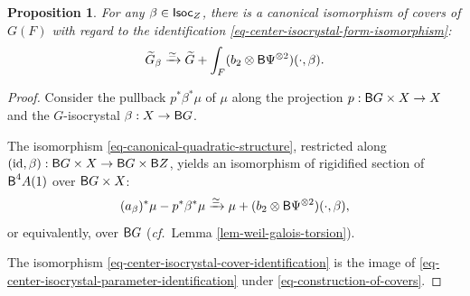 \documentclass[10pt,english,reqno]{amsart}
\newcommand{\Isoc}{\textnormal{\textsf{Isoc}}}
\newcommand{\id}{\mathrm{id}}
\newcommand{\deloop}{\textnormal{\textsf{B}}}
\newtheorem{prop}[subsubsection]{Proposition}
\theoremstyle{definition}
\numberwithin{equation}{section}
\begin{document}
\begin{prop}
\label{prop-center-isocrystal-cover-identification}
For any $\beta \in \Isoc_Z$, there is a canonical isomorphism of covers of $G(F)$ with regard to the identification \eqref{eq-center-isocrystal-form-isomorphism}:
\begin{equation}
\label{eq-center-isocrystal-cover-identification}
\widetilde G_{\beta} \xrightarrow{\simeq} \widetilde G + \int_F (b_2\otimes \deloop\Psi^{\otimes 2})(\cdot, \beta).
\end{equation}
\end{prop}
\begin{proof}
Consider the pullback $p^*\beta^*\mu$ of $\mu$ along the projection $p : \deloop G \times X \rightarrow X$ and the $G$-isocrystal $\beta : X \rightarrow \deloop G$.

The isomorphism \eqref{eq-canonical-quadratic-structure}, restricted along $(\id, \beta) : \deloop G \times X \rightarrow \deloop G\times\deloop Z$, yields an isomorphism of rigidified section of $\deloop^4A(1)$ over $\deloop G\times X$:
\begin{equation}
\label{eq-center-isocrystal-parameter-identification}
(a_{\beta})^*\mu - p^*\beta^*\mu \xrightarrow{\simeq} \mu + (b_2\otimes \deloop\Psi^{\otimes 2})(\cdot, \beta),
\end{equation}
or equivalently, over $\deloop G$ (\emph{cf.}~Lemma \ref{lem-weil-galois-torsion}).

The isomorphism \eqref{eq-center-isocrystal-cover-identification} is the image of \eqref{eq-center-isocrystal-parameter-identification} under \eqref{eq-construction-of-covers}.
\end{proof}

\end{document}
